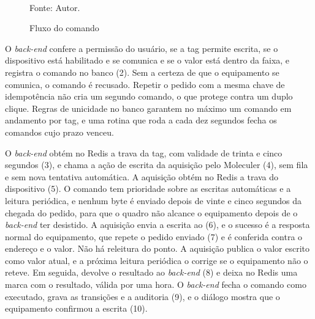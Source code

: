 \begin{figure}[H]
    \centering
    \caption{Fluxo do comando}
    \label{fig:fx_comando_execucao}
    \vspace{0.4cm}
    \vspace{0.2cm} \\
    Fonte: Autor.
\end{figure}

\par O \emph{back-end} confere a permissão do usuário, se a tag permite escrita, se o dispositivo está habilitado e se comunica e se o valor está dentro da faixa, e registra o comando no banco (2). Sem a certeza de que o equipamento se comunica, o comando é recusado. Repetir o pedido com a mesma chave de idempotência não cria um segundo comando, o que protege contra um duplo clique. Regras de unicidade no banco garantem no máximo um comando em andamento por tag, e uma rotina que roda a cada dez segundos fecha os comandos cujo prazo venceu.

\par O \emph{back-end} obtém no Redis a trava da tag, com validade de trinta e cinco segundos (3), e chama a ação de escrita da aquisição pelo Moleculer (4), sem fila e sem nova tentativa automática. A aquisição obtém no Redis a trava do dispositivo (5). O comando tem prioridade sobre as escritas automáticas e a leitura periódica, e nenhum byte é enviado depois de vinte e cinco segundos da chegada do pedido, para que o quadro não alcance o equipamento depois de o \emph{back-end} ter desistido. A aquisição envia a escrita ao  (6), e o sucesso é a resposta normal do equipamento, que repete o pedido enviado (7) e é conferida contra o endereço e o valor. Não há releitura do ponto. A aquisição publica o valor escrito como valor atual, e a próxima leitura periódica o corrige se o equipamento não o reteve. Em seguida, devolve o resultado ao \emph{back-end} (8) e deixa no Redis uma marca com o resultado, válida por uma hora. O \emph{back-end} fecha o comando como executado, grava as transições e a auditoria (9), e o diálogo mostra que o equipamento confirmou a escrita (10).

